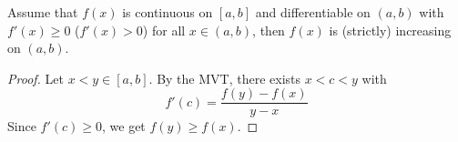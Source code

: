 \begin{thm}
Assume that $f(x)$ is continuous on $[a,b]$ and differentiable on $(a,b)$ with $f'(x) \geq 0$ ($f'(x) > 0$) for all $x\in (a,b)$, then $f(x)$ is (strictly) increasing on $(a,b)$.
\end{thm}

\begin{proof}
Let $x<y \in [a,b]$. By the MVT, there exists $x<c<y$ with \[f'(c) = \frac{f(y) - f(x)}{y-x}\] Since $f'(c) \geq 0$, we get $f(y) \geq f(x)$.
\end{proof}
